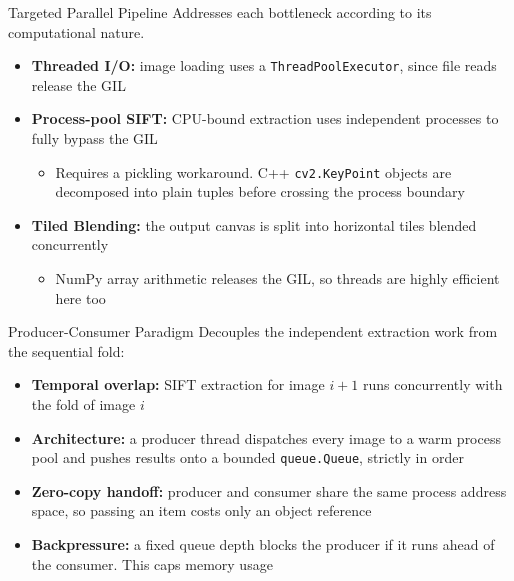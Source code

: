 \documentclass{beamer}
\begin{document}
\begin{frame}{Targeted Parallel Pipeline}
  Addresses each bottleneck according to its computational nature. %
  \normalsize
  \begin{itemize}
    \item \textbf{Threaded I/O:} image loading uses a \texttt{ThreadPoolExecutor}, since file reads release the GIL
    \item \textbf{Process-pool SIFT:} CPU-bound extraction uses independent processes to fully bypass the GIL
      \begin{itemize}
        \item Requires a pickling workaround. C++ \texttt{cv2.KeyPoint} objects are decomposed into plain tuples before crossing the process boundary
      \end{itemize}
    \item \textbf{Tiled Blending:} the output canvas is split into horizontal tiles blended concurrently
      \begin{itemize}
        \item NumPy array arithmetic releases the GIL, so threads are highly efficient here too
      \end{itemize}
  \end{itemize}
\end{frame}

\begin{frame}{Producer-Consumer Paradigm}
  Decouples the independent extraction work from the sequential fold:
  \begin{itemize}
    \item \textbf{Temporal overlap:} SIFT extraction for image $i+1$ runs concurrently with the fold of image $i$
    \item \textbf{Architecture:} a producer thread dispatches every image to a warm process pool and pushes results onto a bounded \texttt{queue.Queue}, strictly in order
    \item \textbf{Zero-copy handoff:} producer and consumer share the same process address space, so passing an item costs only an object reference
    \item \textbf{Backpressure:} a fixed queue depth blocks the producer if it runs ahead of the consumer. This caps memory usage
  \end{itemize}
\end{frame}
\end{document}
